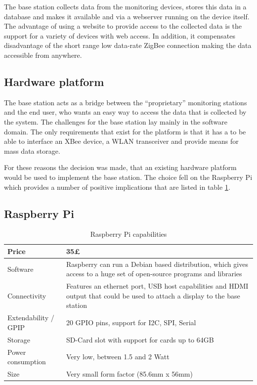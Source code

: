 The base station collects data from the monitoring devices, stores this data in a database and makes it available and via a webserver running on the device itself. The advantage of using a website to provide access to the collected data is the support for a variety of devices with web access. In addition, it compensates disadvantage of the short range low data-rate ZigBee connection making the data accessible from anywhere.  


\subsection{Hardware platform}
The base station acts as a bridge between the “proprietary” monitoring stations and the end user, who wants an easy way to access the data that is collected by the system. The challenges for the base station lay mainly in the software domain. The only requirements that exist for the platform is that it has a to be able to interface an XBee device, a WLAN transceiver and provide means for mass data storage. 

For these reasons the decision was made, that an existing hardware platform would be used to implement the base station. The choice fell on the Raspberry Pi which provides a number of positive implications that are listed in table \ref{tab:raspberry_capabilities}.


\subsection{Raspberry Pi}
\begin{table}
\centering
\begin{tabular}{|l|m{6cm}|}
\hline
	Price &
	35£   \\ 
\hline
  	Software &
  	Raspberry can run a Debian based distribution, which gives access to a huge set of open-source programs and libraries  \\ 
\hline
	Connectivity &
	Features an ethernet port, USB host capabilities and HDMI output that could be used to attach a display to the base station  \\ 
\hline
	Extendability / GPIP  &
	20 GPIO pins, support for I2C, SPI, Serial  \\ 
\hline
	Storage &
	SD-Card slot with support for cards up to 64GB  \\ 
\hline
	Power consumption &
	Very low, between 1.5 and 2 Watt \\ 
\hline
 	Size &
 	Very small form factor (85.6mm x 56mm)  \\ 
\hline 
\end{tabular} 
\caption{Raspberry Pi capabilities}
\label{tab:raspberry_capabilities}
\end{table}

